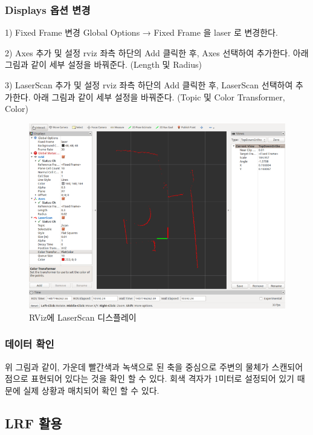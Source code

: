 \subsubsection{Displays 옵션 변경}

1) Fixed Frame 변경
Global Options → Fixed Frame 을 laser 로 변경한다.

2) Axes 추가 및 설정
rviz 좌측 하단의 Add 클릭한 후, Axes 선택하여 추가한다.
아래 그림과 같이 세부 설정을 바꿔준다. (Length 및 Radius)

3) LaserScan 추가 및 설정
rviz 좌측 하단의 Add 클릭한 후, LaserScan 선택하여 추가한다.
아래 그림과 같이 세부 설정을 바꿔준다. (Topic 및 Color Transformer, Color)

\begin{figure}[h]
\centering\includegraphics[width=0.9\columnwidth]{pictures/chapter9/rviz_laser_scan.png}
\caption{RViz에 LaserScan 디스플레이}
\end{figure}

\subsubsection{데이터 확인}

위 그림과 같이, 가운데 빨간색과 녹색으로 된 축을 중심으로 주변의 물체가 스캔되어 점으로 표현되어 있다는 것을 확인 할 수 있다. 회색 격자가 1미터로 설정되어 있기 때문에 실제 상황과 매치되어 확인 할 수 있다.

\subsection{LRF 활용}

